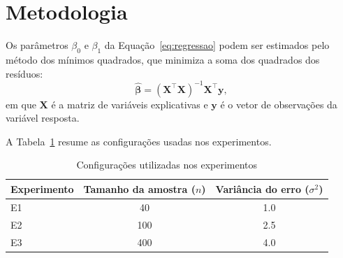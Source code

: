 \section{Metodologia}
\label{sec:metodologia}

Os parâmetros $\beta_0$ e $\beta_1$ da Equação~\eqref{eq:regressao} podem
ser estimados pelo método dos mínimos quadrados, que minimiza a soma dos
quadrados dos resíduos:
\begin{equation}
    \hat{\boldsymbol{\beta}} =
        \left( \mathbf{X}^{\top} \mathbf{X} \right)^{-1}
        \mathbf{X}^{\top} \mathbf{y},
    \label{eq:minimos-quadrados}
\end{equation}
em que $\mathbf{X}$ é a matriz de variáveis explicativas e $\mathbf{y}$ é
o vetor de observações da variável resposta.

A Tabela~\ref{tab:configuracoes} resume as configurações usadas nos
experimentos.

\begin{table}[h]
    \centering
    \caption{Configurações utilizadas nos experimentos}
    \label{tab:configuracoes}
    \begin{tabular}{lcc}
        \toprule
        Experimento & Tamanho da amostra ($n$) & Variância do erro ($\sigma^2$) \\
        \midrule
        E1 & 40  & 1.0 \\
        E2 & 100 & 2.5 \\
        E3 & 400 & 4.0 \\
        \bottomrule
    \end{tabular}
\end{table}
